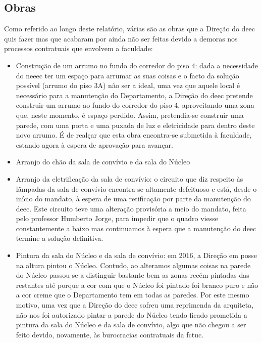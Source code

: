 
\subsection{Obras}

Como referido ao longo deste relatório, várias são as obras que a Direção do \acrshort{deec} quis fazer mas que acabaram por ainda não ser feitas devido a demoras nos processos contratuais que envolvem a faculdade:
\begin{itemize}
\item Construção de um arrumo no fundo do corredor do piso 4: dada a necessidade do \acrshort{neeec} ter um espaço para arrumar as suas coisas e o facto da solução possível (arrumo do piso 3A) não ser a ideal, uma vez que aquele local é necessário para a manutenção do Departamento, a Direção do \acrshort{deec} pretende construir um arrumo ao fundo do corredor do piso 4, aproveitando uma zona que, neste momento, é espaço perdido. Assim, pretendia-se construir uma parede, com uma porta e uma puxada de luz e eletricidade para dentro deste novo arrumo. É de realçar que esta obra encontra-se submetida à faculdade, estando agora à espera de aprovação para avançar.
\item Arranjo do chão da sala de convívio e da sala do Núcleo
\item Arranjo da eletrificação da sala de convívio: o circuito que diz respeito às lâmpadas da sala de convívio encontra-se altamente defeituoso e está, desde o início do mandato, à espera de uma retificação por parte da manutenção do \acrshort{deec}. Este circuito teve uma alteração provisória a meio do mandato, feita pelo professor Humberto Jorge, para impedir que o quadro viesse constantemente a baixo mas continuamos à espera que a manutenção do \acrshort{deec} termine a solução definitiva.
\item Pintura da sala do Núcleo e da sala de convívio: em 2016, a Direção em posse na altura pintou o Núcleo. Contudo, ao alteramos algumas coisas na parede do Núcleo passou-se a distinguir bastante bem as zonas recém pintadas das restantes até porque a cor com que o Núcleo foi pintado foi branco puro e não a cor creme que o Departamento tem em todas as paredes. Por este mesmo motivo, uma vez que a Direção do \acrshort{deec} sofreu uma reprimenda da arquiteta, não nos foi autorizado pintar a parede do Núcleo tendo ficado prometida a pintura da sala do Núcleo e da sala de convívio, algo que não chegou a ser feito devido, novamente, às burocracias contratuais da \acrshort{fctuc}.

\end{itemize}

